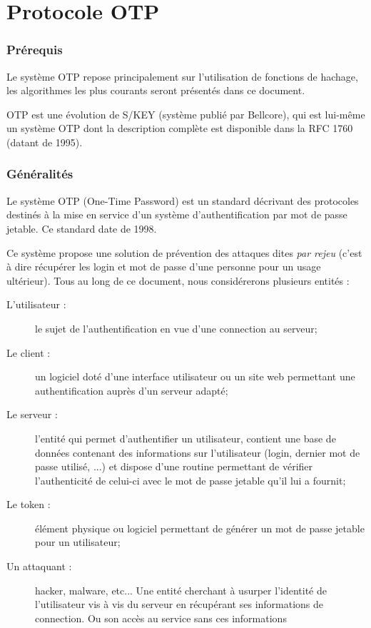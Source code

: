 \documentclass{../res/univ-projet}
\begin{document}
\part{Protocole OTP}
\section{Prérequis}
  Le système OTP repose principalement sur l'utilisation de fonctions de 
  hachage, les algorithmes les plus courants seront présentés dans ce 
  document.

  OTP est une évolution de S/KEY (système publié par Bellcore), qui est 
  lui-même un système OTP dont la description complète est disponible
  dans la RFC 1760 (datant de 1995).

\section{Généralités}
  Le système OTP (One-Time Password) est un standard décrivant des protocoles 
destinés à la mise en service d'un système d'authentification par mot de passe 
jetable. Ce standard date de 1998.

  Ce système propose une solution de prévention des attaques dites \emph{par 
rejeu} (c'est à dire récupérer les login et mot de passe d'une personne pour un 
usage ultérieur). Tous au long de ce document, nous considérerons plusieurs 
entités :

  \begin{description}
    \item[L'utilisateur :] le sujet de l'authentification en vue d'une 
    connection au serveur;
    \item[Le client :] un logiciel doté d'une interface utilisateur ou un site 
    web permettant une authentification auprès d'un serveur adapté;
    \item[Le serveur :] l'entité qui permet d'authentifier un utilisateur,
    contient une base de données contenant des informations sur l'utilisateur 
    (login, dernier mot de 
    passe utilisé, ...) et dispose d'une routine permettant de vérifier 
    l'authenticité de celui-ci avec le mot de passe jetable qu'il lui a fournit;
    \item[Le token :] élément physique ou logiciel permettant de générer un mot 
    de passe jetable pour un utilisateur;
    \item[Un attaquant :] hacker, malware, etc... Une entité cherchant à 
    usurper 
    l'identité de l'utilisateur vis à vis du serveur en récupérant ses informations 
    de connection. Ou son accès au service sans ces informations\\
  \end{description}
\end{document}
